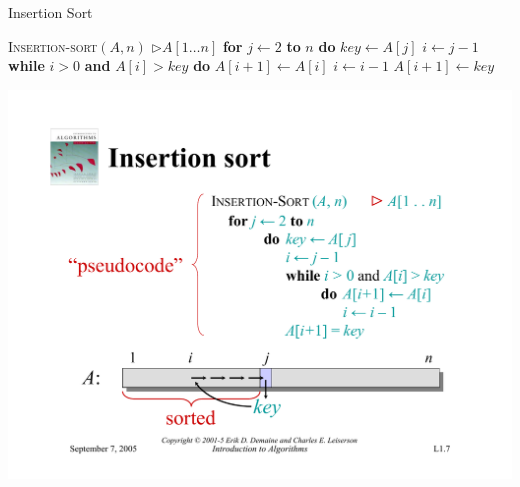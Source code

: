 \documentclass{beamer}
\begin{document}
\begin{frame}{Insertion Sort}
    \begin{algorithm}[H]
        \caption{Insertion Sort}
        \begin{algorithmic}[1]
            \STATE \textsc{Insertion-sort}$(A, n)$ \hspace{5mm} $\rhd A[1 \ldots n]$ 
            \STATE \hspace{1em} \textbf{for} $j \leftarrow 2$ \textbf{to} $n$ \textbf{do}
            \STATE \hspace{2em} $key \leftarrow A[j]$
            \STATE \hspace{2em} $i \leftarrow j - 1$
            \STATE \hspace{2em} \textbf{while} $i > 0$ \textbf{and} $A[i] > key$ \textbf{do}
            \STATE \hspace{3em} $A[i + 1] \leftarrow A[i]$
            \STATE \hspace{3em} $i \leftarrow i - 1$
            \STATE \hspace{2em} $A[i + 1] \leftarrow key$
        \end{algorithmic}
    \end{algorithm}
    
    \centering
    \includegraphics[width=\textwidth, trim={2cm 1cm 2cm 13cm}, clip]{pages/lec1_7}
\end{frame}
\end{document}
